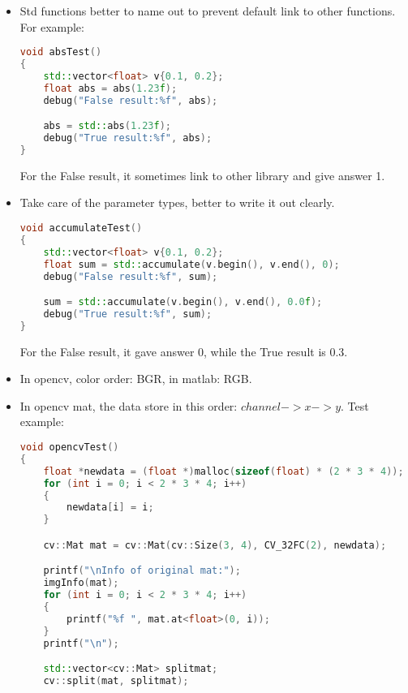 \documentclass[12pt]{article}
\numberwithin{equation}{section}
\begin{document}
{\begin{itemize}
\begin{lstlisting}[language=C++]
	uchar depth = type & CV_MAT_DEPTH_MASK;
	uchar chans = 1 + (type >> CV_CN_SHIFT);

	switch (depth)
	{
	case CV_8U:
		r = "8U";
		break;
	case CV_8S:
		r = "8S";
		break;
	case CV_16U:
		r = "16U";
		break;
	case CV_16S:
		r = "16S";
		break;
	case CV_32S:
		r = "32S";
		break;
	case CV_32F:
		r = "32F";
		break;
	case CV_64F:
		r = "64F";
		break;
	default:
		r = "User";
		break;
	}

	r += "C";
	r += (chans + '0');

	debug("%s %d x %d", r.c_str(), mat.rows, mat.cols);
	//return r;
}
		\end{lstlisting}		
	\item Std functions better to name out to prevent default link to other functions. 
	For example: 
		\begin{lstlisting}[language=C++]
void absTest()
{
	std::vector<float> v{0.1, 0.2};
	float abs = abs(1.23f);
	debug("False result:%f", abs);

	abs = std::abs(1.23f);
	debug("True result:%f", abs);
}
		\end{lstlisting}
	For the False result, it sometimes link to other library and give answer 1.
	\item Take care of the parameter types, better to write it out clearly.
		\begin{lstlisting}[language=C++]
void accumulateTest()
{
	std::vector<float> v{0.1, 0.2};
	float sum = std::accumulate(v.begin(), v.end(), 0);
	debug("False result:%f", sum);

	sum = std::accumulate(v.begin(), v.end(), 0.0f);
	debug("True result:%f", sum);
}
		\end{lstlisting}
	For the False result, it gave answer 0, while the True result is 0.3.
	\item In opencv, color order: BGR, in matlab: RGB.
	\item In opencv mat, the data store in this order: $channel -> x -> y$. Test example:
		\begin{lstlisting}[language=C++]
void opencvTest()
{
	float *newdata = (float *)malloc(sizeof(float) * (2 * 3 * 4));
	for (int i = 0; i < 2 * 3 * 4; i++)
	{
		newdata[i] = i;
	}

	cv::Mat mat = cv::Mat(cv::Size(3, 4), CV_32FC(2), newdata);

	printf("\nInfo of original mat:");
	imgInfo(mat);
	for (int i = 0; i < 2 * 3 * 4; i++)
	{
		printf("%f ", mat.at<float>(0, i));
	}
	printf("\n");

	std::vector<cv::Mat> splitmat;
	cv::split(mat, splitmat);


\end{lstlisting}
\end{itemize}}
\end{document}
